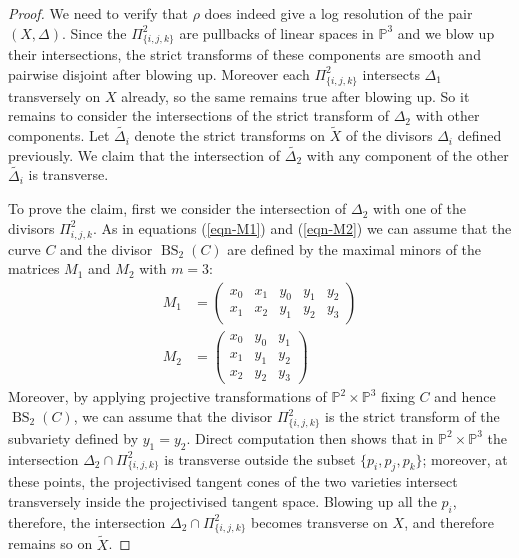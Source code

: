 \documentclass[a4paper,11pt]{article}
\newcommand{\PP}{\mathbb P}
\newcommand{\BS}{\operatorname{BS}}
\begin{document}
\begin{proof}
We need to verify that $\rho$ does indeed give a log resolution of the pair $(X,\Delta)$. Since the $\Pi^2_{\{i,j,k\}}$ are pullbacks of linear spaces in $\PP^3$ and we blow up their intersections, the strict transforms of these components are smooth and pairwise disjoint after blowing up. Moreover each $\Pi^2_{\{i,j,k\}}$ intersects $\Delta_1$ transversely on $X$ already, so the same remains true after blowing up. So it remains to consider the intersections of the strict transform of $\Delta_2$ with other components. Let $\widetilde{\Delta_i}$ denote the strict transforms on $\widetilde{X}$ of the divisors $\Delta_i$ defined previously. We claim that the intersection of $\widetilde{\Delta_2}$ with any component of the other $\widetilde{\Delta_i}$ is transverse.

To prove the claim, first we consider the intersection of $\Delta_2$ with one of the divisors $\Pi^2_{i,j,k}$. 
As in equations (\ref{eqn-M1}) and (\ref{eqn-M2}) we can assume that the curve $C$ and the divisor $\BS_2(C)$ are defined by the maximal minors of the matrices $M_1$ and $M_2$ with $m=3$:
\begin{align*}
       M_1 &=
    \begin{pmatrix}
      x_0 & x_1  & y_0 & y_1 & y_2 \\
      x_1 & x_2  & y_1 & y_2 & y_3
    \end{pmatrix}\\
     M_2 &= 
    \begin{pmatrix}
      x_0 & y_0 & y_1\\
      x_1 & y_1 & y_2\\
      x_2 & y_2 & y_3
    \end{pmatrix}
\end{align*}
Moreover, by applying projective transformations of $\PP^2 \times \PP^3$ fixing $C$ and hence $\BS_2(C)$, we can assume that the divisor $\Pi^2_{\{i,j,k\}}$ is the strict transform of the subvariety defined by $y_1=y_2$. Direct computation then shows that in $\PP^2 \times \PP^3$ the intersection $\Delta_2 \cap \Pi^2_{\{i,j,k\}}$ is transverse outside the subset $\{p_i,p_j,p_k\}$; moreover, at these points, the projectivised tangent cones of the two varieties intersect transversely inside the projectivised tangent space. Blowing up all the $p_i$, therefore, the intersection $\Delta_2 \cap \Pi^2_{\{i,j,k\}}$ becomes transverse on $X$, and therefore remains so on $\widetilde{X}$.


\end{proof}
\end{document}
